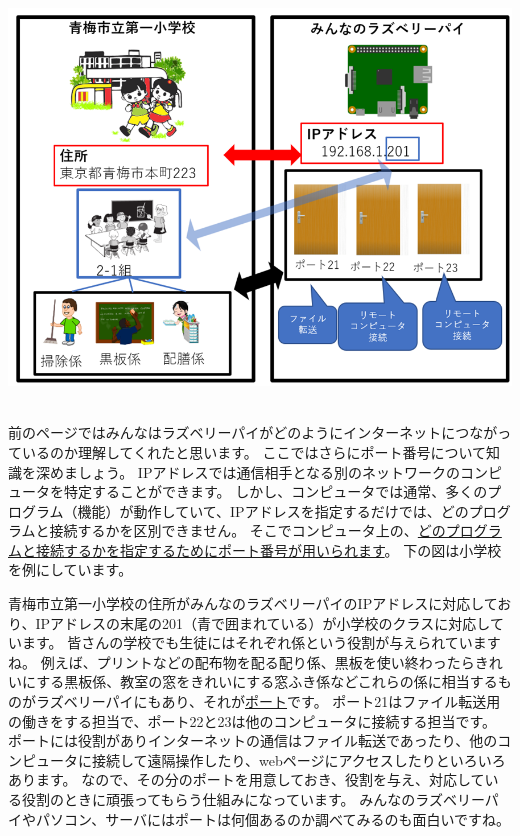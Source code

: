 \documentclass[a4paper,12pt,dvipdfmx]{jarticle}
\begin{document}
\centering
\includegraphics[width=15.004cm,height=11.0cm]{ome7-img020.png}
\flushleft

前のページではみんなはラズベリーパイがどのようにインターネットにつながっているのか理解してくれたと思います。
ここではさらにポート番号について知識を深めましょう。
IPアドレスでは通信相手となる別のネットワークのコンピュータを特定することができます。
しかし、コンピュータでは通常、多くのプログラム（機能）が動作していて、IPアドレスを指定するだけでは、どのプログラムと接続するかを区別できません。
そこでコンピュータ上の、\underline{どのプログラムと接続するかを指定するためにポート番号が用いられます}。
下の図は小学校を例にしています。

青梅市立第一小学校の住所がみんなのラズベリーパイのIPアドレスに対応しており、IPアドレスの末尾の201（青で囲まれている）が小学校のクラスに対応しています。
皆さんの学校でも生徒にはそれぞれ係という役割が与えられていますね。
例えば、プリントなどの配布物を配る配り係、黒板を使い終わったらきれいにする黒板係、教室の窓をきれいにする窓ふき係などこれらの係に相当するものがラズベリーパイにもあり、それが\underline{ポート}です。
ポート21はファイル転送用の働きをする担当で、ポート22と23は他のコンピュータに接続する担当です。
ポートには役割がありインターネットの通信はファイル転送であったり、他のコンピュータに接続して遠隔操作したり、webページにアクセスしたりといろいろあります。
なので、その分のポートを用意しておき、役割を与え、対応している役割のときに頑張ってもらう仕組みになっています。
みんなのラズベリーパイやパソコン、サーバにはポートは何個あるのか調べてみるのも面白いですね。
\end{document}
